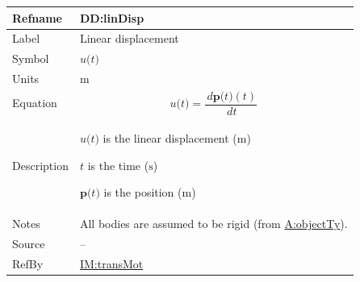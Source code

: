 \documentclass[12pt]{article}
\begin{document}
\medskip
\noindent
\begin{minipage}{\textwidth}
\begin{tabular}{>{\raggedright}p{}>{\raggedright\arraybackslash}p{}}
\toprule \textbf{Refname} & \textbf{DD:linDisp}
\label{DD:linDisp}
\\ \midrule
Label & Linear displacement
        
\\ \midrule
Symbol & $u\text{(}t\text{)}$
         
\\ \midrule
Units & ${\text{m}}$
        
\\ \midrule
Equation & \begin{displaymath}
           u\text{(}t\text{)}=\frac{\,d\symbf{p}\text{(}t\text{)}\left(t\right)}{\,dt}
           \end{displaymath}
\\ \midrule
Description & \begin{symbDescription}
              \item{$u\text{(}t\text{)}$ is the linear displacement (${\text{m}}$)}
              \item{$t$ is the time (${\text{s}}$)}
              \item{$\symbf{p}\text{(}t\text{)}$ is the position (${\text{m}}$)}
              \end{symbDescription}
\\ \midrule
Notes & All bodies are assumed to be rigid (from \hyperref[assumpOT]{A:objectTy}).
        
\\ \midrule
Source & --
         
\\ \midrule
RefBy & \hyperref[IM:transMot]{IM:transMot}
        
\\ \bottomrule
\end{tabular}
\end{minipage}
\end{document}
